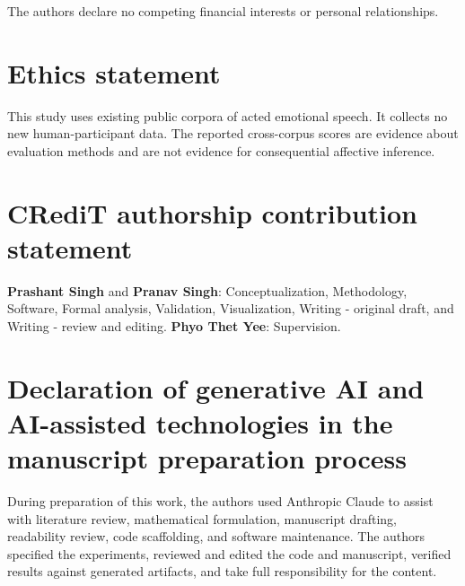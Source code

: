 The authors declare no competing financial interests or personal relationships.

\section*{Ethics statement}

This study uses existing public corpora of acted emotional speech. It collects
no new human-participant data. The reported cross-corpus scores are evidence
about evaluation methods and are not evidence for consequential affective
inference.

\section*{CRediT authorship contribution statement}

\textbf{Prashant Singh} and \textbf{Pranav Singh}: Conceptualization,
Methodology, Software, Formal analysis, Validation, Visualization, Writing -
original draft, and Writing - review and editing.
\textbf{Phyo Thet Yee}: Supervision.

\section*{Declaration of generative AI and AI-assisted technologies in the
manuscript preparation process}

During preparation of this work, the authors used Anthropic Claude to assist
with literature review, mathematical formulation, manuscript drafting,
readability review, code scaffolding, and software maintenance.
The authors specified the experiments, reviewed and
edited the code and manuscript, verified results against generated artifacts,
and take full responsibility for the content.
